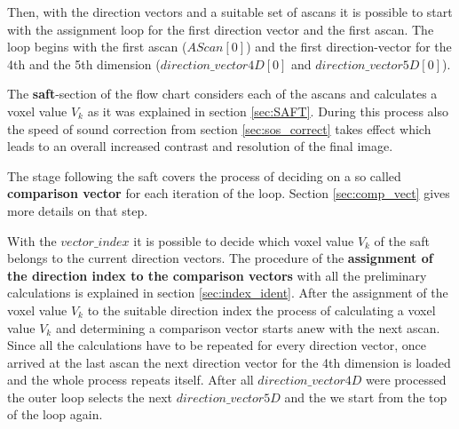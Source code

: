 Then, with the direction vectors and a suitable set of \acp{ascan} it is possible to start with the assignment loop for the first direction vector and the first \ac{ascan}. The loop begins with the first \ac{ascan} ($AScan[0]$) and the first direction-vector for the 4th and the 5th dimension ($direction\_vector4D[0]$ and $direction\_vector5D[0]$). 

The \textbf{\ac{saft}}-section of the flow chart considers each of the \acp{ascan} and calculates a voxel value $V_k$ as it was explained in section \ref{sec:SAFT}. During this process also the speed of sound correction from section \ref{sec:sos_correct} takes effect which leads to an overall increased contrast and resolution of the final image.  

The stage following the \ac{saft} covers the process of deciding on a so called \textbf{comparison vector} for each iteration of the loop. Section \ref{sec:comp_vect} gives more details on that step.

With the $vector\_index$ it is possible to decide which voxel value $V_k$ of the \ac{saft} belongs to the current direction vectors. The procedure of the \textbf{assignment of the direction index to the comparison vectors} with all the preliminary calculations is explained in section \ref{sec:index_ident}. After the assignment of the voxel value $V_k$ to the suitable direction index the process of calculating a voxel value $V_k$ and determining a comparison vector starts anew with the next \ac{ascan}.
Since all the calculations have to be repeated for every direction vector, once arrived at the last \ac{ascan} the next direction vector for the 4th dimension is loaded and the whole process repeats itself. After all $direction\_vector4D$ were processed the outer loop selects the next $direction\_vector5D$ and the we start from the top of the loop again.  

